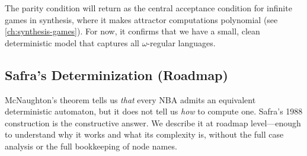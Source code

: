 The parity condition will return as the central acceptance condition for infinite games in synthesis, where it makes attractor computations polynomial (see \cref{ch:synthesis-games}). For now, it confirms that we have a small, clean deterministic model that captures all $\omega$-regular languages.

\subsection{Safra's Determinization (Roadmap)}
\label{subsec:safra-roadmap}

McNaughton's theorem tells us \emph{that} every NBA admits an equivalent deterministic automaton, but it does not tell us \emph{how} to compute one. Safra's 1988 construction is the constructive answer. We describe it at roadmap level---enough to understand why it works and what its complexity is, without the full case analysis or the full bookkeeping of node names.

